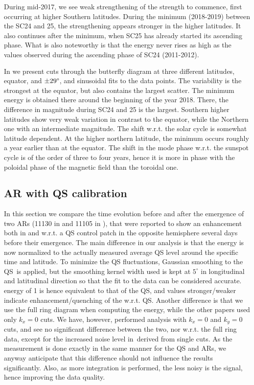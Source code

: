 \documentclass{aa}
\begin{document}
During mid-2017, we see weak strengthening of the \fff strength to commence, first occurring at higher Southern latitudes. During the minimum (2018-2019) between the SC24 and 25, the strengthening appears stronger in the higher latitudes. It also continues after the minimum, when 
SC25
has already started its ascending phase. What is also noteworthy is that the \fff
energy
never rises as high as the values observed during the ascending phase of SC24 (2011-2012).

In  we present cuts through the butterfly
diagram at three different latitudes, equator, and $\pm 29\degree$, and sinusoidal fits to the data points. The variability is the strongest at the equator, but also contains the largest scatter. The minimum \fff energy 
is obtained there 
around the beginning of the year 2018. There, the difference in magnitude during SC24 and 25 is the largest. Southern higher latitudes show very weak variation in contrast to the equator, 
while the Northern one with an intermediate magnitude. 
The shift w.r.t. the solar cycle is somewhat latitude dependent. At the higher northern latitude, the \fff minimum occurs roughly a year earlier than at the equator. The shift in the \fff mode phase w.r.t. the sunspot cycle is of the order of three to four years, hence it is more in phase with the 
poloidal phase of the magnetic field than the toroidal one.

\subsection{AR \fff with QS calibration}\label{arf}

In this section we compare the \fff time evolution before and after the emergence of 
two ARs (11130 in  and 11105 in ), that were reported to show an enhancement both in \cite{SRB16} and \cite{Waidele22} w.r.t. a QS control patch
in the opposite hemisphere several days before their emergence. The main difference in our analysis
is that the \fff energy is now normalized to the actually measured average QS level
around the specific time and latitude. To minimize
the QS fluctuations, Gaussian smoothing to the QS \ef\,is applied, 
but the smoothing kernel width used is kept at 
$5^\circ$ in longitudinal and latitudinal direction
so that the fit to the data can be considered accurate.
\fff energy of 1 is hence
equivalent to that of the QS, and values stronger/weaker 
indicate enhancement/quenching of the \fff w.r.t. QS.
Another difference is that we use the
full ring diagram when computing the \fff energy, while the
other papers used only $k_x=0$ cuts. We have, however, performed
analysis with $k_x=0$ and $k_y=0$ cuts, and see no significant
difference between the two, nor w.r.t. the full ring data, except for the
increased noise level in \ef\,derived from single cuts.
As the measurement is done exactly in the same
manner for the QS and ARs, we anyway anticipate
that this difference should not influence the results significantly. 
Also, as more integration is performed, the less noisy is the 
signal, hence improving the data quality. 
\end{document}
